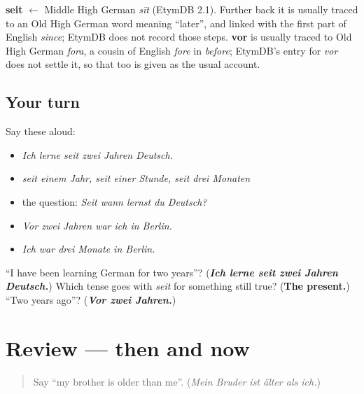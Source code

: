 \begin{cousinweb}
\textbf{seit} $\leftarrow$ Middle High German \emph{sīt} (EtymDB 2.1). Further back it is usually traced to an Old High German word meaning \textquotedblleft{}later\textquotedblright{}, and linked with the first part of English \emph{since}; EtymDB does not record those steps. \textbf{vor} is usually traced to Old High German \emph{fora}, a cousin of English \emph{fore} in \emph{before}; EtymDB's entry for \emph{vor} does not settle it, so that too is given as the usual account.
\end{cousinweb}

\subsection*{Your turn}
Say these aloud:

\begin{itemize}
\raggedright
  \item \emph{Ich lerne seit zwei Jahren Deutsch.}
  \item \emph{seit einem Jahr, seit einer Stunde, seit drei Monaten}
  \item the question: \emph{Seit wann lernst du Deutsch?}
  \item \emph{Vor zwei Jahren war ich in Berlin.}
  \item \emph{Ich war drei Monate in Berlin.}
\end{itemize}

\begin{tcolorbox}[breakable,colback=teal!4,colframe=teal!35!black,title={Before you move on}]
\textquotedblleft{}I have been learning German for two years\textquotedblright{}? (\emph{\textbf{Ich lerne seit zwei Jahren Deutsch.}}) Which tense goes with \emph{seit} for something still true? (\textbf{The present.}) \textquotedblleft{}Two years ago\textquotedblright{}? (\emph{\textbf{Vor zwei Jahren.}})
\end{tcolorbox}
\section[(review)]{Review — then and now}

\label{lesson:GE-C259-review}



\begin{quote}
Say \textquotedblleft{}my brother is older than me\textquotedblright{}. (\emph{Mein Bruder ist älter als ich.})
\end{quote}

